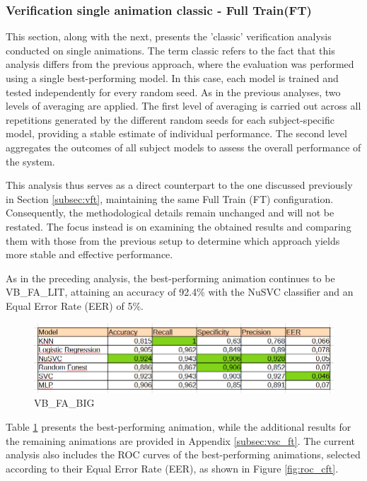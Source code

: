 \documentclass{article}
\begin{document}
\subsubsection{Verification single animation classic - Full Train(FT)}

This section, along with the next, presents the 'classic' verification analysis conducted on single animations.
The term classic refers to the fact that this analysis differs from the previous approach, where the evaluation was performed using a single best-performing model.
In this case, each model is trained and tested independently for every random seed.
As in the previous analyses, two levels of averaging are applied. 
The first level of averaging is carried out across all repetitions generated by the different random seeds for each subject-specific model, providing a stable estimate of individual performance. 
The second level aggregates the outcomes of all subject models to assess the overall performance of the system.

This analysis thus serves as a direct counterpart to the one discussed previously in Section \ref{subsec:vft}, maintaining the same Full Train (FT) configuration. 
Consequently, the methodological details remain unchanged and will not be restated. 
The focus instead is on examining the obtained results and comparing them with those from the previous setup to determine which approach yields more stable and effective performance.

As in the preceding analysis, the best-performing animation continues to be VB\_FA\_LIT, attaining an accuracy of 92.4\% with the NuSVC classifier and an Equal Error Rate (EER) of 5\%.

\begin{figure}[ht]
    \centering
    \includegraphics[width = 0.8
    \textwidth]{Images/Results/Classic_procedure/Verification_single/ft/VB_FA_LIT.png}
    \caption{VB\_FA\_BIG}
    \label{fig:VB_FA_LIT_cft}
\end{figure}

Table \ref{fig:VB_FA_LIT_cft} presents the best-performing animation, while the additional results for the remaining animations are provided in Appendix \ref{subsec:vsc_ft}.
The current analysis also includes the ROC curves of the best-performing animations, selected according to their Equal Error Rate (EER), as shown in Figure \ref{fig:roc_cft}.
\end{document}
